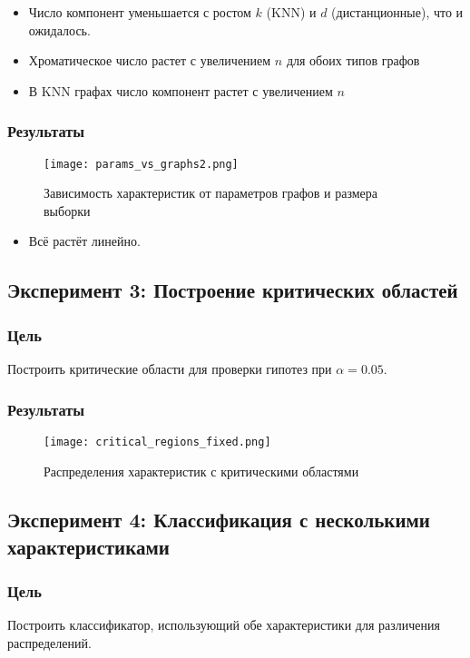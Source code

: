 \documentclass[a4paper, 12pt]{article}
\begin{document}
\begin{itemize}
    \item Число компонент уменьшается с ростом $k$ (KNN) и $d$ (дистанционные), что и ожидалось.
    \item Хроматическое число растет с увеличением $n$ для обоих типов графов
    \item В KNN графах число компонент растет с увеличением $n$
\end{itemize}

\subsubsection{Результаты}
\begin{figure}[H]
    \centering
    \texttt{[image: params\_vs\_graphs2.png]}
    \caption{Зависимость характеристик от параметров графов и размера выборки}
\end{figure}

\begin{itemize}
    \item Всё растёт линейно.
\end{itemize}


\subsection{Эксперимент 3: Построение критических областей}
\subsubsection{Цель}
Построить критические области для проверки гипотез при $\alpha=0.05$.

\subsubsection{Результаты}
\begin{figure}[H]
    \centering
    \texttt{[image: critical\_regions\_fixed.png]}
    \caption{Распределения характеристик с критическими областями}
\end{figure}


\subsection{Эксперимент 4: Классификация с несколькими характеристиками}
\subsubsection{Цель}
Построить классификатор, использующий обе характеристики для различения распределений.
\end{document}
